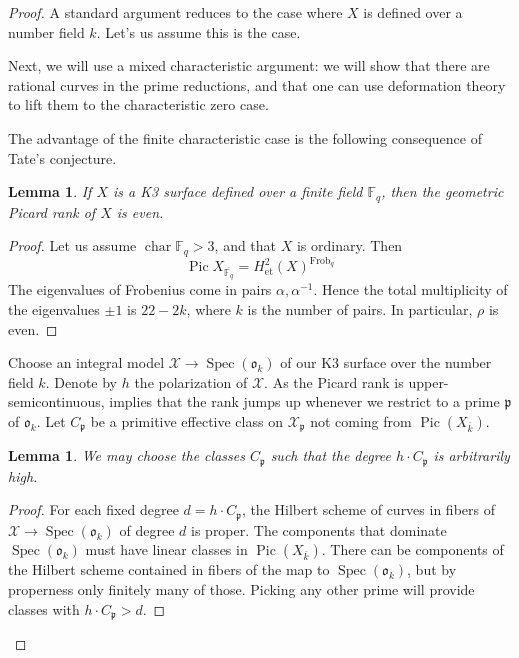 \documentclass{amsart}
\renewcommand{\prime}{\mathfrak{p}}
\theoremstyle{plain}
\newtheorem{lemma}[theorem]{Lemma}
\theoremstyle{definition}
\theoremstyle{remark}
\DeclareMathOperator{\characteristic}{char}
\DeclareMathOperator{\Spec}{Spec}
\DeclareMathOperator{\Frob}{Frob}
\DeclareMathOperator{\Pic}{Pic}
\begin{document}
\begin{proof}
A standard argument reduces to the case where $X$ is defined over a number field $k$. Let's us assume this is the case.

Next, we will use a mixed characteristic argument: we will show that
there are rational curves in the prime reductions, and that one can use deformation theory to lift them
to the characteristic zero case.

The advantage of the finite characteristic case is the following consequence of Tate's conjecture.
\begin{lemma}
\label{lemma:tate}
If $X$ is a K3 surface defined over a finite field $\mathbb{F}_q$,
 then the geometric Picard rank of $X$ is even.
\end{lemma}
\begin{proof}
Let us assume $\characteristic \mathbb{F}_q >3$, and that $X$ is ordinary. Then
\[
	\Pic X_{\overline{\mathbb{F}_q}} = H^2_{\text{et}}(X)^{\Frob_q}
\]
The eigenvalues of Frobenius come in pairs $\alpha, \alpha^{-1}$. Hence the total multiplicity of the
eigenvalues $\pm 1$ 
is $22-2k$, where $k$ is the number of pairs. In particular, $\rho$ is even.
\end{proof}

Choose an integral model $\mathcal{X} \to \Spec(\mathfrak{o}_k)$ of our K3 surface over the number
field $k$. Denote by $h$ the polarization of $\mathcal{X}$. 
As the Picard rank is upper-semicontinuous,  implies that the rank jumps up
whenever we restrict to a prime $\prime$ of $\mathfrak{o}_k$. 
Let $C_{\prime}$ be a primitive effective class on $\mathcal{X}_\prime$ not coming from
$\Pic(X_{\bar{k}})$.

\begin{lemma}
We may choose the classes $C_{\prime}$ such that the degree $h\cdot C_{\prime}$ is arbitrarily high.
\end{lemma}
\begin{proof}
For each fixed degree $d=h \cdot C_{\prime}$, the Hilbert scheme of curves in fibers of
$\mathcal{X} \to \Spec(\mathfrak{o}_k)$ of degree $d$ is proper. 
The components that dominate $\Spec(\mathfrak{o}_k)$
must have linear classes in $\Pic(X_{\bar{k}})$. There can be components of the Hilbert scheme contained
in fibers of the map to $\Spec(\mathfrak{o}_k)$, but by properness only finitely many of those.
Picking any other prime will provide classes with $h\cdot C_{\prime}>d$.
\end{proof}


\end{proof}
\end{document}
